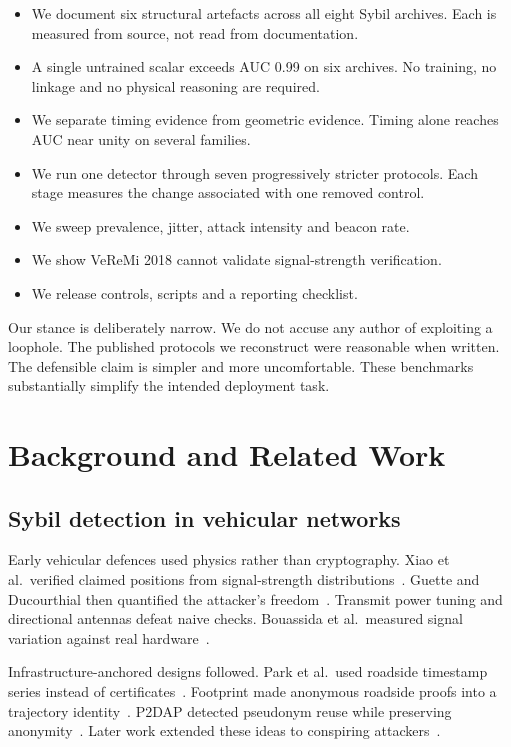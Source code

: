 \documentclass[journal,twoside]{IEEEtran}
\begin{document}
\begin{itemize}
  \item We document six structural artefacts across all eight Sybil archives.
        Each is measured from source, not read from documentation.
  \item A single untrained scalar exceeds AUC 0.99 on six archives.
        No training, no linkage and no physical reasoning are required.
  \item We separate timing evidence from geometric evidence.
        Timing alone reaches AUC near unity on several families.
  \item We run one detector through seven progressively stricter protocols.
        Each stage measures the change associated with one removed control.
  \item We sweep prevalence, jitter, attack intensity and beacon rate.
  \item We show VeReMi 2018 cannot validate signal-strength verification.
  \item We release controls, scripts and a reporting checklist.
\end{itemize}

Our stance is deliberately narrow.
We do not accuse any author of exploiting a loophole.
The published protocols we reconstruct were reasonable when written.
The defensible claim is simpler and more uncomfortable.
These benchmarks substantially simplify the intended deployment task.

\section{Background and Related Work}

\subsection{Sybil detection in vehicular networks}

Early vehicular defences used physics rather than cryptography.
Xiao et al.\ verified claimed positions from signal-strength distributions~\cite{xiao2006}.
Guette and Ducourthial then quantified the attacker's freedom~\cite{guette2007}.
Transmit power tuning and directional antennas defeat naive checks.
Bouassida et al.\ measured signal variation against real hardware~\cite{bouassida2009}.

Infrastructure-anchored designs followed.
Park et al.\ used roadside timestamp series instead of certificates~\cite{park2009}.
Footprint made anonymous roadside proofs into a trajectory identity~\cite{chang2011}.
P2DAP detected pseudonym reuse while preserving anonymity~\cite{zhou2007,zhou2011}.
Later work extended these ideas to conspiring attackers~\cite{feng2016}.
\end{document}
